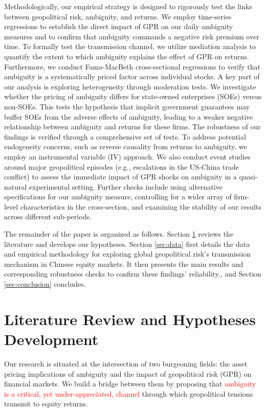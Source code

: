 \documentclass[preprint,12pt,authoryear]{elsarticle}
\begin{document}
Methodologically, our empirical strategy is designed to rigorously test the links between geopolitical risk, ambiguity, and returns. We employ time-series regressions to establish the direct impact of GPR on our daily ambiguity measures and to confirm that ambiguity commands a negative risk premium over time. To formally test the transmission channel, we utilize mediation analysis to quantify the extent to which ambiguity explains the effect of GPR on returns. Furthermore, we conduct Fama-MacBeth cross-sectional regressions to verify that ambiguity is a systematically priced factor across individual stocks. A key part of our analysis is exploring heterogeneity through moderation tests. We investigate whether the pricing of ambiguity differs for state-owned enterprises (SOEs) versus non-SOEs. This tests the hypothesis that implicit government guarantees may buffer SOEs from the adverse effects of ambiguity, leading to a weaker negative relationship between ambiguity and returns for these firms. The robustness of our findings is verified through a comprehensive set of tests. To address potential endogeneity concerns, such as reverse causality from returns to ambiguity, we employ an instrumental variable (IV) approach. We also conduct event studies around major geopolitical episodes (e.g., escalations in the US-China trade conflict) to assess the immediate impact of GPR shocks on ambiguity in a quasi-natural experimental setting. Further checks include using alternative specifications for our ambiguity measure, controlling for a wider array of firm-level characteristics in the cross-section, and examining the stability of our results across different sub-periods.

The remainder of the paper is organized as follows. Section \ref{sec:literature} reviews the literature and develops our hypotheses. Section \ref{sec:data} first details the data and empirical methodology for exploring global geopolitical risk’s transmission mechanism in Chinese equity markets. It then presents the main results and corresponding robustness checks to confirm these findings’ reliability., and Section \ref{sec:conclusion} concludes.

\section{Literature Review and Hypotheses Development}
\label{sec:literature}

Our research is situated at the intersection of two burgeoning fields: the asset pricing implications of ambiguity and the impact of geopolitical risk (GPR) on financial markets. We build a bridge between them by proposing that \textcolor{red}{ambiguity is a critical, yet under-appreciated, channel} through which geopolitical tensions transmit to equity returns.
\end{document}
